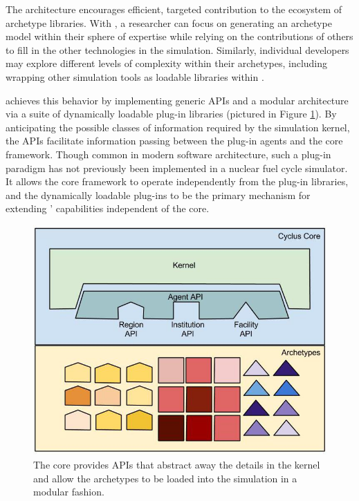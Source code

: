 The \Cyclus architecture encourages efficient, targeted contribution to the ecosystem of
archetype libraries.
With \Cyclus, a researcher can focus on generating an archetype model within their
sphere of expertise while relying on the contributions of others to fill
in the other technologies in the simulation.
Similarly, individual developers may explore different levels of complexity within their archetypes, including
wrapping other simulation tools as loadable libraries within \Cyclus.

\Cyclus achieves this behavior by implementing generic \glspl{API} and a
modular architecture via a suite of dynamically loadable plug-in libraries
(pictured in Figure \ref{fig:framework}). By anticipating the possible classes of
information required by the simulation kernel, the \Cyclus \glspl{API}
facilitate information passing between the plug-in agents and the core
framework.
Though common in modern software architecture, such a plug-in paradigm has not
previously been implemented in a nuclear fuel cycle simulator.
It allows the core \Cyclus framework to operate independently from the plug-in libraries, and the
dynamically loadable plug-ins to be the primary mechanism for extending \Cyclus'
capabilities independent of the core.

\begin{figure}[htbp]
\begin{center}
\includegraphics[width=\columnwidth]{./images/framework}
\caption{The \Cyclus core provides \glspl{API} that abstract away the details in
the kernel and allow the archetypes to be loaded into the simulation in a modular
fashion.}
\end{center}
\label{fig:framework}
\end{figure}


